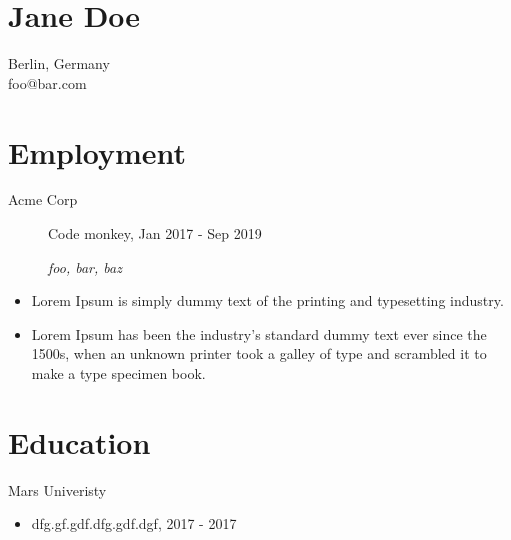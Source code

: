 \documentclass[10pt]{article}
\begin{document}
\section{Jane Doe}
Berlin, Germany\\
foo@bar.com

\section{Employment}

\begin{description}
    \item [Acme Corp] Code monkey, Jan 2017 - Sep 2019
    \item [] \footnotesize\textsl{
     foo,  bar,  baz 
    }
\end{description}
\begin{itemize}
    
    \item Lorem Ipsum is simply dummy text of the printing and typesetting industry.
    
    \item Lorem Ipsum has been the industry's standard dummy text ever since the 1500s, when an unknown printer took a galley of type and scrambled it to make a type specimen book.
    
\end{itemize}

\section{Education}

\begin{description}
    \item [Mars Univeristy]
\end{description}
\begin{itemize}
    \item dfg.gf.gdf.dfg.gdf.dgf, 2017 - 2017
\end{itemize}
\end{document}
